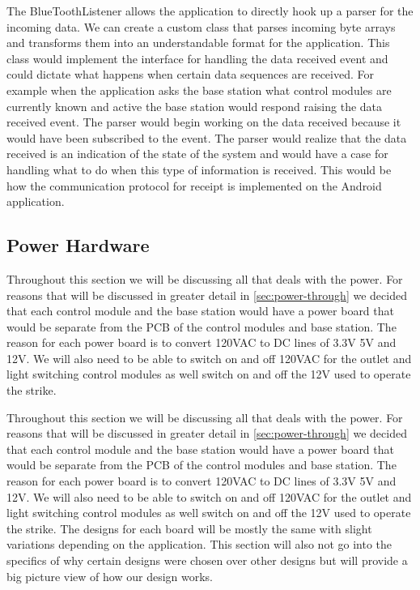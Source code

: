 
The BlueToothListener allows the application to directly hook up a parser for
the incoming data. We can create a custom class that parses incoming byte
arrays and transforms them into an understandable format for the application.
This class would implement the interface for handling the data received event
and could dictate what happens when certain data sequences are received. For
example when the application asks the base station what control modules are
currently known and active the base station would respond raising the data
received event. The parser would begin working on the data received because it
would have been subscribed to the event. The parser would realize that the data
received is an indication of the state of the system and would have a case for
handling what to do when this type of information is received. This would be
how the communication protocol for receipt is implemented on the Android
application.

\subsection{Power Hardware}
\label{sec:power-hw}

Throughout this section we will be discussing all that deals with the power.
For reasons that will be discussed in greater detail in
\autoref{sec:power-through} we decided that each control module and the base
station would have a power board that would be separate from the PCB of the
control modules and base station.  The reason for each power board is to
convert 120VAC to DC lines of 3.3V 5V and 12V. We will also need to be able to
switch on and off 120VAC for the outlet and light switching control modules as
well switch on and off the 12V used to operate the strike.

Throughout this section we will be discussing all that deals with the
power. For reasons that will be discussed in greater detail in
\autoref{sec:power-through} we decided that each control module and the base
station would have a power board that would be separate from the PCB of the
control modules and base station. The reason for each power board is to convert
120VAC to DC lines of 3.3V 5V and 12V. We will also need to be able to switch
on and off 120VAC for the outlet and light switching control modules as well
switch on and off the 12V used to operate the strike. The designs for each
board will be mostly the same with slight variations depending on the
application. This section will also not go into the
specifics of why certain designs were chosen over other designs but will
provide a big picture view of how our design works.

